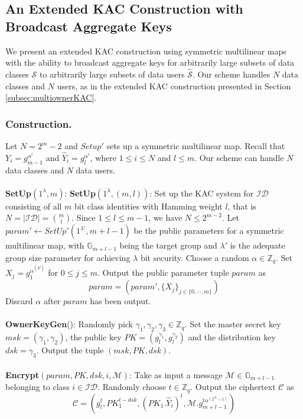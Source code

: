 \subsection{An Extended KAC Construction with Broadcast Aggregate Keys}
\label{subsec:multiuserKAC_2}

We present an extended KAC construction using symmetric multilinear maps with the ability to broadcast aggregate keys for arbitrarily large subsets of data classes $\mathcal{S}$ to arbitrarily large subsets of data users $\hat{\mathcal{S}}$. Our scheme handles $N$ data classes and $N$ users, as in the extended KAC construction presented in Section \ref{subsec:multiownerKAC}.
% 
\subsubsection{Construction.} Let $N=2^m-2$ and $Setup'$ sets up a symmetric multilinear map. Recall that $Y_i=g^{\alpha^i}_{m-1}$ and $\hat{Y}_i=g^{\alpha^i}_l$, where $1\leq i \leq N$ and $l\leq m$. Our scheme can handle $N$ data classes and $N$ data users.\\\\
% 
\noindent\textbf{SetUp}$(1^{\lambda},m)$: \noindent\textbf{SetUp}$(1^{\lambda},(m,l))$: Set up the KAC system for $\mathcal{ID}$ consisting of all $m$ bit class identities with Hamming weight $l$, that is $N=|\mathcal{ID}|=\binom{m}{l}$. Since $1\leq l\leq m-1$, we have $N\leq 2^{m-2}$. Let $param'\leftarrow SetUp'(1^{\lambda'},m+l-1)$ be the public parameters for a symmetric multilinear map, with $\mathbb{G}_{m+l-1}$ being the target group and $\lambda'$ is the adequate group size parameter for achieving $\lambda$ bit security. Choose a random $\alpha\in \mathbb{Z}_q$. Set $X_j=g^{\alpha^{(2^j)}}_{1}$ for $0\leq j\leq m$.  Output the public parameter tuple $param$ as
\begin{equation}
 param = (param',\{X_j\}_{j\in\{0,\cdots,m\}})\nonumber
\end{equation}
\noindent Discard $\alpha$ after $param$ has been output.\\\\
% 
\noindent\textbf{OwnerKeyGen}(): Randomly pick $\gamma_1, \gamma_2, \gamma_3\in \mathbb{Z}_q$. Set the master secret key $msk=(\gamma_1,\gamma_2)$, the public key $PK=(g^{\gamma_1}_{l},g^{\gamma_2}_{l})$ and the distribution key $dsk=\gamma_3$. Output the tuple $(msk,PK,dsk)$.\\\\
% 
\noindent\textbf{Encrypt}$(param,PK,dsk,i,\mathcal{M})$: Take as input a message $\mathcal{M} \in \mathbb{G}_{m+l-1}$ belonging to class $i \in \mathcal{ID}$. Randomly choose $t \in\mathbb{Z}_q$. Output the ciphertext $\mathcal{C}$ as 
\begin{equation}
 \mathcal{C}=\left(g^{t}_{l},PK^{t-dsk}_1,(PK_1.\hat{Y}_i)^{t},\mathcal{M}.g^{t\alpha^{(2^m-1)}}_{m+l-1}\right)\nonumber
\end{equation}

